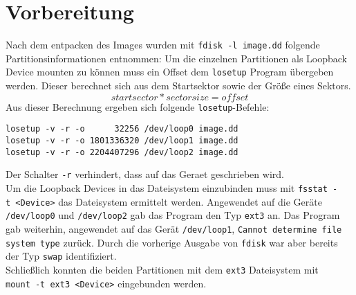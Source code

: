 \section{Vorbereitung}

Nach dem entpacken des Images wurden mit \texttt{fdisk~-l~image.dd} folgende Partitionsinformationen entnommen:
\lstset{basicstyle=\footnotesize}
Um die einzelnen Partitionen als Loopback Device mounten zu können muss ein Offset dem \texttt{losetup} Program übergeben werden. Dieser berechnet sich aus dem Startsektor sowie der Größe eines Sektors.\[startsector*sectorsize=offset\]
Aus dieser Berechnung ergeben sich folgende \texttt{losetup}-Befehle:

\begin{verbatim}
losetup -v -r -o      32256 /dev/loop0 image.dd
losetup -v -r -o 1801336320 /dev/loop1 image.dd
losetup -v -r -o 2204407296 /dev/loop2 image.dd
\end{verbatim}
\noindent Der Schalter \texttt{-r} verhindert, dass auf das Geraet geschrieben wird.\\

Um die Loopback Devices in das Dateisystem einzubinden muss mit \texttt{fsstat~-t~<Device>} das Dateisystem ermittelt werden. Angewendet auf die Geräte \texttt{/dev/loop0} und \texttt{/dev/loop2} gab das Program den Typ \texttt{ext3} an. Das Program gab weiterhin, angewendet auf das Gerät \texttt{/dev/loop1}, \texttt{Cannot determine file system type} zurück. Durch die vorherige Ausgabe von \texttt{fdisk} war aber bereits der Typ \texttt{swap} identifiziert.\\

Schließlich konnten die beiden Partitionen mit dem \texttt{ext3} Dateisystem mit \texttt{mount~-t~ext3~<Device>} eingebunden werden.